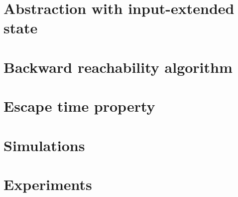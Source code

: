 \documentclass[electronic]{kthesis}
\newcommand{\vect}[1]{\ensuremath{ \mathbf{#1}}}
\theoremstyle{named}
\begin{document}
\chapter{Abstraction with input-extended state}




%
\chapter{Backward reachability algorithm}

%
\chapter{Escape time property}

%
%
\chapter{Simulations}

\newcommand{\um}{\u_{-}}
\newcommand{\up}{\u_{+}}
\newcommand{\uo}{\vect{0}}





%
\chapter{Experiments}




%

{}
\end{document}
